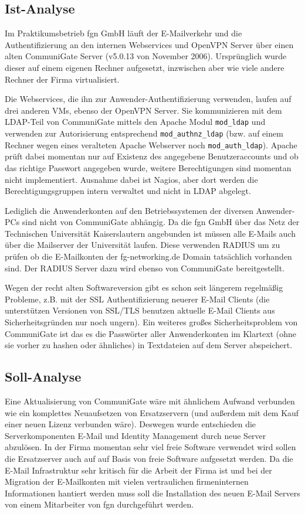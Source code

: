 \documentclass[11pt,a4paper,titlepage=firstiscover]{scrartcl} %
\begin{document}
\subsection{Ist-Analyse}
Im Praktikumsbetrieb fgn GmbH l\"auft der E-Mailverkehr und die Authentifizierung an den internen Webservices und OpenVPN Server \"uber einen alten CommuniGate Server (v5.0.13 von November 2006). Urspr\"unglich wurde dieser auf einem eigenen Rechner aufgesetzt, inzwischen aber wie viele andere Rechner der Firma virtualisiert. 

Die Webservices, die ihn zur Anwender-Authentifizierung verwenden, laufen auf drei anderen VMs, ebenso der OpenVPN Server. Sie kommunizieren mit dem LDAP-Teil von CommuniGate mittels den Apache Modul \texttt{mod\_ldap} und verwenden zur Autorisierung entsprechend \texttt{mod\_authnz\_ldap} (bzw. auf einem Rechner wegen eines veralteten Apache Webserver noch \texttt{mod\_auth\_ldap}). Apache pr\"uft dabei momentan nur auf Existenz des angegebene Benutzeraccounts und ob das richtige Passwort angegeben wurde, weitere Berechtigungen sind momentan nicht implementiert. Ausnahme dabei ist Nagios, aber dort werden die Berechtigungsgruppen intern verwaltet und nicht in LDAP abgelegt.

Lediglich die Anwenderkonten auf den Betriebssystemen der diversen Anwender-PCs sind nicht von CommuniGate abh\"angig. Da die fgn GmbH \"uber das Netz der Technischen Universit\"at Kaiserslautern angebunden ist m\"ussen alle E-Mails auch \"uber die Mailserver der Universit\"at laufen. Diese verwenden RADIUS um zu pr\"ufen ob die E-Mailkonten der fg-networking.de Domain tats\"achlich vorhanden sind. Der RADIUS Server dazu wird ebenso von CommuniGate bereitgestellt. 

Wegen der recht alten Softwareversion gibt es schon seit l\"angerem regelm\"a\ss{}ig Probleme, z.B. mit der SSL Authentifizierung neuerer E-Mail Clients (die unterst\"utzen Versionen von SSL/TLS benutzen aktuelle E-Mail Clients aus Sicherheitsgr\"unden nur noch ungern). Ein weiteres gro\ss{}es Sicherheitsproblem von CommuniGate ist das es die Passw\"orter aller Anwenderkonten im Klartext (ohne sie vorher zu hashen oder \"ahnliches) in Textdateien auf dem Server abspeichert.

\subsection{Soll-Analyse}
Eine Aktualisierung von CommuniGate w\"are mit \"ahnlichem Aufwand verbunden wie ein komplettes Neuaufsetzen von Ersatzservern (und au\ss{}erdem mit dem Kauf einer neuen Lizenz verbunden w\"are). Deswegen wurde entschieden die Serverkomponenten E-Mail und Identity Management durch neue Server abzul\"osen. In der Firma momentan sehr viel freie Software verwendet wird sollen die Ersatzserver auch auf auf Basis von freie Software aufgesetzt werden. Da die E-Mail Infrastruktur sehr kritisch f\"ur die Arbeit der Firma ist und bei der Migration der E-Mailkonten mit vielen vertraulichen firmeninternen Informationen hantiert werden muss soll die Installation des neuen E-Mail Servers von einem Mitarbeiter von fgn durchgef\"uhrt werden.
\end{document}
